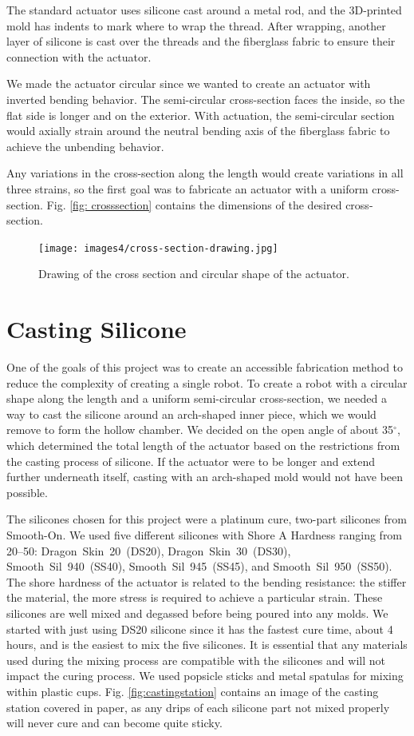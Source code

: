 The standard actuator uses silicone cast around a metal rod, and the 3D-printed mold has indents to mark where to wrap the thread. After wrapping, another layer of silicone is cast over the threads and the fiberglass fabric to ensure their connection with the actuator. 

We made the actuator circular since we wanted to create an actuator with inverted bending behavior. The semi-circular cross-section faces the inside, so the flat side is longer and on the exterior. With actuation, the semi-circular section would axially strain around the neutral bending axis of the fiberglass fabric to achieve the unbending behavior. 

Any variations in the cross-section along the length would create variations in all three strains, so the first goal was to fabricate an actuator with a uniform cross-section. Fig. \ref{fig: crosssection} contains the dimensions of the desired cross-section.

\begin{figure}[h]
    \centering
    \texttt{[image: images4/cross-section-drawing.jpg]}
    \caption{Drawing of the cross section and circular shape of the actuator.}
    \label{fig:crosssection}
\end{figure}

\section{Casting Silicone}
One of the goals of this project was to create an accessible fabrication method to reduce the complexity of creating a single robot. To create a robot with a circular shape along the length and a uniform semi-circular cross-section, we needed a way to cast the silicone around an arch-shaped inner piece, which we would remove to form the hollow chamber. We decided on the open angle of about 35$^\circ$, which determined the total length of the actuator based on the restrictions from the casting process of silicone. If the actuator were to be longer and extend further underneath itself, casting with an arch-shaped mold would not have been possible. 

The silicones chosen for this project were a platinum cure, two-part silicones from Smooth-On. We used five different silicones with Shore A Hardness ranging from 20--50: Dragon~Skin~20~(DS20), Dragon~Skin~30~(DS30), Smooth~Sil~940~(SS40), Smooth~Sil~945~(SS45), and Smooth~Sil~950~(SS50). The shore hardness of the actuator is related to the bending resistance: the stiffer the material, the more stress is required to achieve a particular strain. These silicones are well mixed and degassed before being poured into any molds. We started with just using DS20 silicone since it has the fastest cure time, about 4 hours, and is the easiest to mix the five silicones. It is essential that any materials used during the mixing process are compatible with the silicones and will not impact the curing process. We used popsicle sticks and metal spatulas for mixing within plastic cups. Fig. \ref{fig:castingstation} contains an image of the casting station covered in paper, as any drips of each silicone part not mixed properly will never cure and can become quite sticky. 

